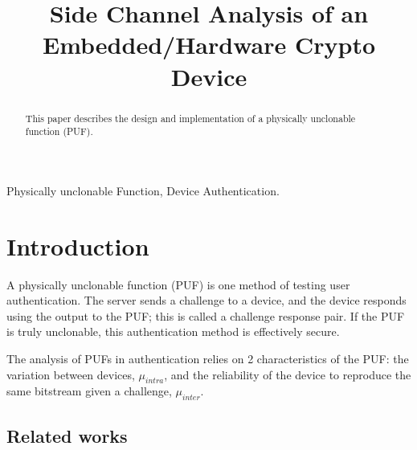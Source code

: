 
\usepackage{tikz}
\usepackage{verbatim}
\usepackage{listings}


\title{Side Channel Analysis of an Embedded/Hardware Crypto Device}

\author{
}

\maketitle


\begin{abstract}
%
This paper describes the design and implementation of a physically unclonable function (PUF). 

 
\end{abstract}

\begin{IEEEkeywords}
Physically unclonable Function, Device Authentication.
\end{IEEEkeywords}

\section{Introduction}
	A physically unclonable function (PUF) is one method of testing user authentication. The server sends a challenge to a device, and the device responds using the output to the PUF; this is called a challenge response pair. If the PUF is truly unclonable, this authentication method is effectively secure. 

	The analysis of PUFs in authentication relies on 2 characteristics of the PUF: the variation between devices, $\mu_{intra}$, and the reliability of the device to reproduce the same bitstream given a challenge, $\mu_{inter}$. 


\subsection{Related works}

